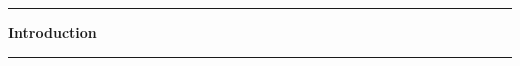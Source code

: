 \pagebreak
\chapter[Introduction]{}\vspace{-2cm}\noindent\rule{\textwidth}{2.5pt}
\thispagestyle{empty}

\vspace{5cm}\textbf{\huge{Introduction}}

\medskip\noindent\rule{\textwidth}{1pt}

\lipsum[1-2]